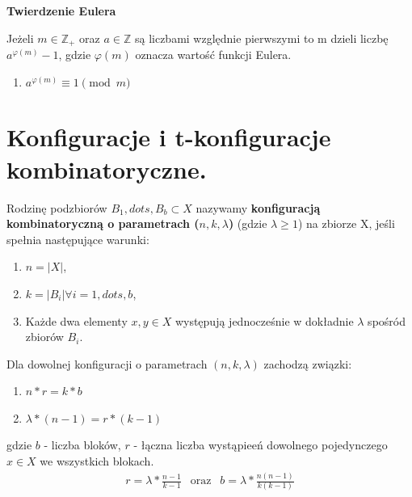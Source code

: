 \documentclass[12pt]{article}
\begin{document}
    \begin{definition}
    \textbf{Twierdzenie Eulera}
    
    Jeżeli $m \in \mathbb{Z_{+}}$ oraz $a \in \mathbb{Z}$ są liczbami względnie pierwszymi to m dzieli liczbę $a^{\varphi(m)} - 1$, gdzie $\varphi (m)$ oznacza wartość funkcji Eulera.
    
    \begin{enumerate}
    \item $a^{\varphi (m)} \equiv 1 \pmod m$\newline
    \end{enumerate}
    
    \end{definition}
    \newpage

    \section{Konfiguracje i t-konfiguracje kombinatoryczne.}

    \begin{definition}
        Rodzinę podzbiorów $B_1, dots, B_b \subset X$ nazywamy \textbf{konfiguracją kombinatoryczną o parametrach ($n, k, \lambda$)}
        (gdzie $\lambda \geq 1$) na zbiorze X, jeśli spełnia następujące warunki:
        \begin{enumerate}
            \item $n = |X|$,
            \item $k = |B_i| \forall i = 1, dots, b$,
            \item Każde dwa elementy $x, y \in X$ występują jednocześnie w dokładnie $\lambda$ spośród zbiorów $B_i$.
        \end{enumerate}
    \end{definition}

    \begin{theorem}
        Dla dowolnej konfiguracji o parametrach $(n, k, \lambda)$ zachodzą związki:
        \begin{enumerate}
            \item $n * r = k * b$
            \item $\lambda * (n-1) = r * (k-1)$
        \end{enumerate}
        gdzie $b$ - liczba bloków, $r$ - łączna liczba wystąpieeń dowolnego pojedynczego $x \in X$ we wszystkich blokach.
        \begin{align*}
            r = \lambda  * \frac{n-1}{k-1} ~~ \text{ oraz } ~~ b = \lambda * \frac{n(n-1)}{k(k-1)}
        \end{align*}
    \end{theorem}
\end{document}

